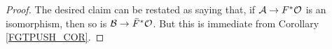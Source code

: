 \documentclass[a4paper,10pt
]{article}%
\numberwithin{equation}{section}
\numberwithin{figure}{section}
\theoremstyle{definition} %
\newcommand{\1}{\ensuremath{\mathbbm 1}}%
\begin{document}
\begin{proof}
	The desired claim can be restated as saying that,
	if $\mathcal{A} \to F^{\**} \mathcal{O}$
	is an isomorphism,
	then so is $\mathcal{B} \to \bar{F}^{\**} \mathcal{O}$.
	But this is immediate from Corollary \ref{FGTPUSH_COR}.      
\end{proof}





\providecommand{\bysame}{\leavevmode\hbox to3em{\hrulefill}\thinspace}
\providecommand{\MR}{\relax\ifhmode\unskip\space\fi MR }
\providecommand{\MRhref}[2]{%
  \href{http://www.ams.org/mathscinet-getitem?mr=#1}{#2}
}
\providecommand{\doi}[1]{%
  doi:\href{https://dx.doi.org/#1}{#1}}
\providecommand{\arxiv}[1]{%
  arXiv:\href{https://arxiv.org/abs/#1}{#1}}
\providecommand{\href}[2]{#2}
\end{document}
